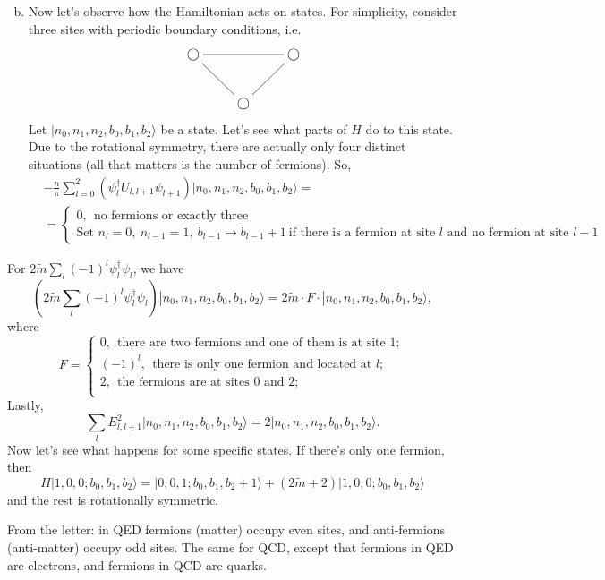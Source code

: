 \begin{enumerate}[(a)]
\[	\]
	\item Now let's observe how the Hamiltonian acts on states. For simplicity, consider three sites with periodic boundary conditions, i.e.
	\[
	\xymatrix{
	\bigcirc \ar@{-}[rr]& & \bigcirc \\
	& \bigcirc\ar@{-}[ru] \ar@{-}[lu] &
	}
	\]
	Let $|n_0,n_1,n_2,b_0,b_1,b_2\rangle$ be a state. Let's see what parts of $H$ do to this state. Due to the rotational symmetry, there are actually only four distinct situations (all that matters is the number of fermions). So, 
	\[\begin{split}
&-\frac{n}{\pi}\sum_{l=0}^2 (\psi^\dagger_l U_{l,l+1} \psi_{l+1}) |n_0,n_1,n_2,b_0,b_1,b_2\rangle =\\ &= \begin{cases}
0, \ \ \text{no fermions or exactly three}\\
\text{Set } n_{l} = 0, \ n_{l-1} = 1, \ b_{l-1} \mapsto b_{l-1} + 1 \ \text{if there is a fermion at site }l \text{ and no fermion at site }l-1
\end{cases}
\end{split}
	\]
	\end{enumerate}
	For $2\tilde{m}\sum_{l} (-1)^l \psi_l^\dagger \psi_l$, we have
	\[
	(2\tilde{m}\sum_{l} (-1)^l \psi_l^\dagger \psi_l) |n_0,n_1,n_2,b_0,b_1,b_2\rangle  = 2 \tilde{m} \cdot F \cdot |n_0,n_1,n_2,b_0,b_1,b_2\rangle,
	\]
	where 
	\[
	F = \begin{cases}
	0, \ \ \text{there are two fermions and one of them is at site }1;\\
	(-1)^l, \ \ \text{there is only one fermion and located at } l;\\
	2, \ \ \text{the fermions are at sites }0\text{ and }2;\\
	
	\end{cases}
	\]
	Lastly,
	\[
	\sum_l E^2_{l,l+1} |n_0,n_1,n_2,b_0,b_1,b_2\rangle = 2|n_0,n_1,n_2,b_0,b_1,b_2\rangle.
	\]
	Now let's see what happens for some specific states. If there's only one fermion, then
	\[
	H|1,0,0; b_0,b_1,b_2\rangle = |0,0,1; b_0,b_1,b_2+1\rangle + (2\tilde{m}+2)|1,0,0; b_0,b_1,b_2\rangle 
	\]
	and the rest is rotationally symmetric.
	
	
	From the letter: in QED fermions (matter) occupy even sites, and anti-fermions (anti-matter) occupy odd sites. The same for QCD, except that fermions in QED are electrons, and fermions in QCD are quarks.
	
